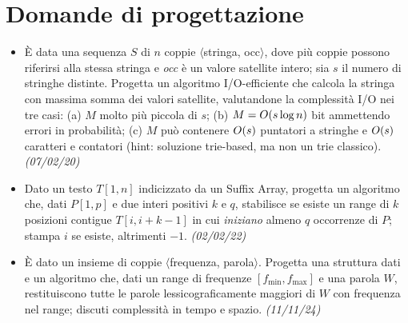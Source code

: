 \section{Domande di progettazione}

\begin{itemize}[leftmargin=1.4em]
\item {} \`E data una sequenza $S$ di $n$ coppie $\langle$stringa, occ$\rangle$, dove pi\`u
coppie possono riferirsi alla stessa stringa e \emph{occ} \`e un valore satellite intero; sia $s$ il
numero di stringhe distinte. Progetta un algoritmo I/O-efficiente che calcola la stringa con massima
somma dei valori satellite, valutandone la complessit\`a I/O nei tre casi: (a) $M$ molto pi\`u
piccola di $s$; (b) $M=O\!\left(s\log n\right)$ bit ammettendo errori in probabilit\`a; (c) $M$ pu\`o contenere
$O\!\left(s\right)$ puntatori a stringhe e $O\!\left(s\right)$ caratteri e contatori (hint: soluzione trie-based, ma non un
trie classico). \emph{(07/02/20)}
\item {} Dato un testo $T[1,n]$ indicizzato da un Suffix Array, progetta un algoritmo che,
dati $P[1,p]$ e due interi positivi $k$ e $q$, stabilisce se esiste un range di $k$ posizioni
contigue $T[i,i+k-1]$ in cui \emph{iniziano} almeno $q$ occorrenze di $P$; stampa $i$ se esiste,
altrimenti $-1$. \emph{(02/02/22)}
\item {} \`E dato un insieme di coppie $\langle$frequenza, parola$\rangle$. Progetta una
struttura dati e un algoritmo che, dati un range di frequenze $[f_{\min},f_{\max}]$ e una parola
$W$, restituiscono tutte le parole lessicograficamente maggiori di $W$ con frequenza nel range;
discuti complessit\`a in tempo e spazio. \emph{(11/11/24)}
\end{itemize}
